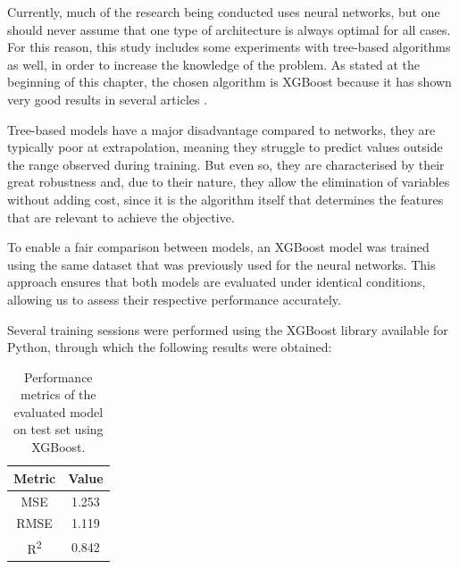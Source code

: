 Currently, much of the research being conducted uses neural networks, but one should never assume that one type of architecture is always optimal for all cases. For this reason, this study includes some experiments with tree-based algorithms as well, in order to increase the knowledge of the problem. As stated at the beginning of this chapter, the chosen algorithm is XGBoost because it has shown very good results in several articles \cite{zheng2024advancedpaymentsecuritysystemxgboost, Computer-aided-boosting}.

Tree-based models have a major disadvantage compared to networks, they are typically poor at extrapolation, meaning they struggle to predict values outside the range observed during training. But even so, they are characterised by their great robustness and, due to their nature, they allow the elimination of variables without adding cost, since it is the algorithm itself that determines the features that are relevant to achieve the objective.

To enable a fair comparison between models, an XGBoost model was trained using the same dataset that was previously used for the neural networks. This approach ensures that both models are evaluated under identical conditions, allowing us to assess their respective performance accurately.

Several training sessions were performed using the XGBoost library available for Python, through which the following results were obtained:

\begin{table}[H]
    \centering
    \begin{tabular}{|c|c|}
    \hline
    \textbf{Metric} & \textbf{Value} \\
    \hline
    MSE & 1.253 \\
    RMSE & 1.119 \\
    R\textsuperscript{2} & 0.842 \\
    \hline
    \end{tabular}
    \caption{Performance metrics of the evaluated model on test set using XGBoost.}
    \label{tab:model_performance_xgboost}
\end{table}

